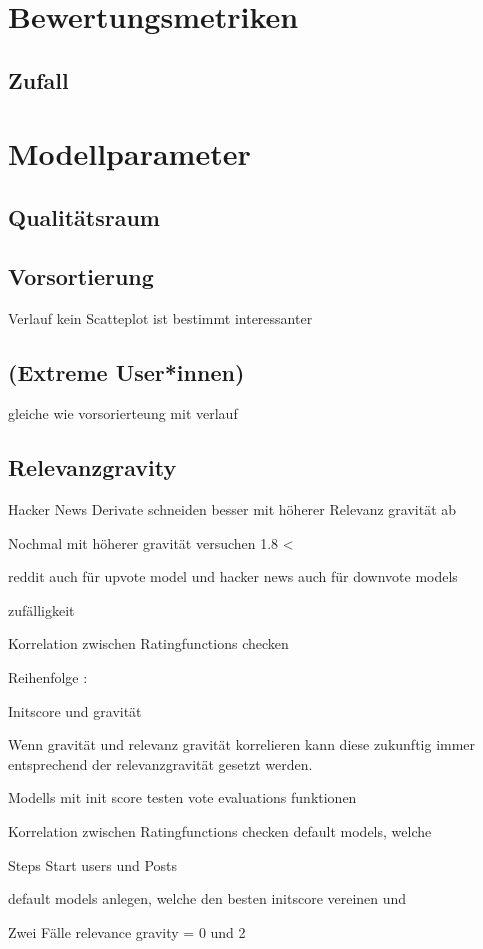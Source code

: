 \section{Bewertungsmetriken}

\subsection{Zufall}


\section{Modellparameter}

\subsection{Qualitätsraum}

\subsection{Vorsortierung}

Verlauf kein Scatteplot ist bestimmt interessanter

\subsection{(Extreme User*innen)}

gleiche wie vorsorierteung mit verlauf


\subsection{Relevanzgravity}

Hacker News Derivate schneiden besser mit höherer Relevanz gravität ab

Nochmal mit höherer gravität versuchen 1.8 < 


reddit auch für upvote model und hacker news auch für downvote models

zufälligkeit


Korrelation zwischen Ratingfunctions checken


Reihenfolge :

Initscore und gravität

Wenn gravität und relevanz gravität korrelieren kann diese zukunftig immer entsprechend der relevanzgravität gesetzt werden.

Modells mit init score testen
vote evaluations funktionen

Korrelation zwischen Ratingfunctions checken
default models, welche 

Steps
Start users und Posts

default models anlegen, welche den besten initscore vereinen und 



Zwei Fälle relevance gravity = 0 und 2


